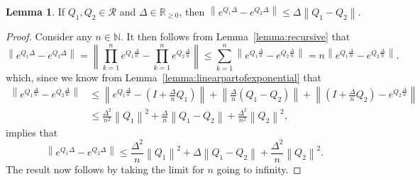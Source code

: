 \documentclass[10pt,a4paper]{paper}
\theoremstyle{definition}
\newtheorem{lemma}[theorem]{Lemma}
\newcommand{\nats}{\mathbb{N}}
\newcommand{\reals}{\mathbb{R}}
\newcommand{\realsnonneg}{\reals_{\geq 0}}
\newcommand{\norm}[1]{\left\lVert #1 \right\rVert}
\begin{document}
\begin{lemma}\label{lemma:differencebetweenexponentials}
If $Q_1,Q_2\in\mathcal{R}$ and $\Delta\in\realsnonneg$, then $\norm{e^{Q_1\Delta}-e^{Q_2\Delta}}\leq\Delta\norm{Q_1-Q_2}$.
\end{lemma}
\begin{proof}
Consider any $n\in\nats$. It then follows from Lemma~\ref{lemma:recursive} that
\begin{equation*}
\norm{e^{Q_1\Delta}-e^{Q_2\Delta}}
=\norm{\prod_{k=1}^n e^{Q_1\frac{\Delta}{n}}-\prod_{k=1}^n e^{Q_2\frac{\Delta}{n}}}
\leq\sum_{k=1}^n\norm{e^{Q_1\frac{\Delta}{n}}-e^{Q_2\frac{\Delta}{n}}}
=
n\norm{e^{Q_1\frac{\Delta}{n}}-e^{Q_2\frac{\Delta}{n}}}.
\end{equation*}
which, since we know from Lemma~\ref{lemma:linearpartofexponential} that
\begin{align*}
\norm{e^{Q_1\frac{\Delta}{n}}-e^{Q_2\frac{\Delta}{n}}}
&\leq
\norm{e^{Q_1\frac{\Delta}{n}}-(I+\frac{\Delta}{n}Q_1)}
+
\norm{\frac{\Delta}{n}(Q_1-Q_2)}
+\norm{(I+\frac{\Delta}{n}Q_2)-e^{Q_2\frac{\Delta}{n}}}\\
&\leq\frac{\Delta^2}{n^2}\norm{Q_1}^2
+
\frac{\Delta}{n}\norm{Q_1-Q_2}
+
\frac{\Delta^2}{n^2}\norm{Q_2}^2,
\end{align*}
implies that
\begin{equation*}
\norm{e^{Q_1\Delta}-e^{Q_2\Delta}}
\leq
\frac{\Delta^2}{n}\norm{Q_1}^2
+
\Delta\norm{Q_1-Q_2}
+
\frac{\Delta^2}{n}\norm{Q_2}^2.
\end{equation*}
The result now follows by taking the limit for $n$ going to infinity.
\end{proof}
\end{document}
